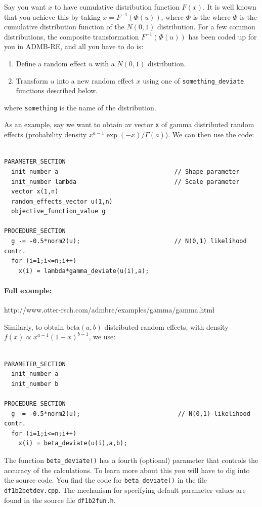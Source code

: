 \documentclass[12pt,letter,reqno]{book}
\begin{document}
Say you  want $x$ to have cumulative distribution function $F(x)$. 
It is well known that you achieve this by taking $x=F^{-1}(\Phi(u))$,
where $\Phi$ is the where $\Phi$ is the cumulative distribution function 
of the $N(0,1)$ distribution. For a few common distributions, the composite
transformation $F^{-1}(\Phi(u))$ has been coded up for you in ADMB-RE,
and all you have to do is:
\begin{enumerate}
  \item Define a random effect $u$ with a $N(0,1)$ distribution.
  \item Transform $u$ into a new random effect $x$ using one of
        \texttt{something\_deviate} functions described below.
\end{enumerate}
where \texttt{something} is the name of the distribution.

As an example, say we want to obtain av vector \texttt{x} of gamma distributed 
random effects (probability density $x^{a-1}\exp(-x)/\Gamma(a)$). We can 
then use the code:
\begin{lstlisting}

PARAMETER_SECTION
  init_number a                                // Shape parameter
  init_number lambda                           // Scale parameter
  vector x(1,n)
  random_effects_vector u(1,n)
  objective_function_value g

PROCEDURE_SECTION
  g -= -0.5*norm2(u);          	               // N(0,1) likelihood contr.
  for (i=1;i<=n;i++) 
    x(i) = lambda*gamma_deviate(u(i),a);

\end{lstlisting}
\paragraph{Full example:} http://www.otter-rsch.com/admbre/examples/gamma/gamma.html

Similarly, to obtain beta$(a,b)$ distributed random effects, 
with density $f(x)\propto x^{a-1}(1-x)^{b-1}$, we use:
\begin{lstlisting}

PARAMETER_SECTION
  init_number a
  init_number b

PROCEDURE_SECTION
  g -= -0.5*norm2(u);                           // N(0,1) likelihood contr.
  for (i=1;i<=n;i++) 
    x(i) = beta_deviate(u(i),a,b);

\end{lstlisting}
The function \texttt{beta\_deviate()} has a fourth (optional) parameter that controls
the accuracy of the calculations. To learn more about this you will have
to dig into the source code. You find the code for \texttt{beta\_deviate()}
in the file \texttt{df1b2betdev.cpp}. The mechanism for specifying
default parameter values are found in the source file \texttt{df1b2fun.h}.
\end{document}
